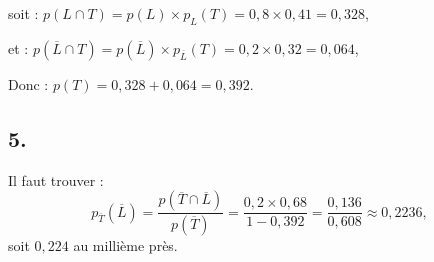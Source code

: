 soit : \(p(L \cap T) = p(L) \times p_L(T) = 0{,}8 \times 0{,}41 = 0{,}328\),

et : \(p(\overline{L} \cap T) = p(\overline{L}) \times p_{\overline{L}}(T) = 0{,}2 \times 0{,}32 = 0{,}064\),

Donc : \(p(T) = 0{,}328 + 0{,}064 = 0{,}392\).

\subsection*{5.}

Il faut trouver :
\[
p_{\overline{T}}({\overline{L}}) = \dfrac{p({\overline{T}} \cap {\overline{L}})}{p({\overline{T}})} = \dfrac{0{,}2 \times 0{,}68}{1 - 0{,}392} = \dfrac{0{,}136}{0{,}608} \approx 0{,}2236,
\]
soit \(0{,}224\) au millième près.

